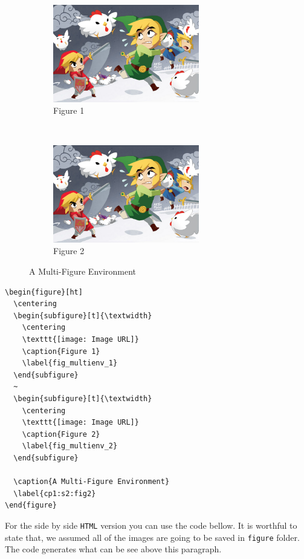 \documentclass[12pt]{report}
\begin{document}
\begin{figure}[ht]
	\centering
	\begin{subfigure}[t]{\textwidth}
		\centering
		\includegraphics[width=0.7\textwidth]{figures/Sample/tumblr_static_eaceks0rfxsss8o4swscw40wo.jpg}
		\caption{Figure 1}
		\label{fig_multienv_1}
	\end{subfigure}
	~
	\begin{subfigure}[t]{\textwidth}
		\centering
		\includegraphics[width=0.7\textwidth]{figures/Sample/tumblr_static_eaceks0rfxsss8o4swscw40wo.jpg}
		\caption{Figure 2}
		\label{fig_multienv_2}
	\end{subfigure}
	
	\caption{A Multi-Figure Environment}
	\label{cp1:s2:fig2}
\end{figure}
\begin{verbatim}
\begin{figure}[ht]
  \centering
  \begin{subfigure}[t]{\textwidth}
    \centering
    \texttt{[image: Image URL]}
    \caption{Figure 1}
    \label{fig_multienv_1}
  \end{subfigure}
  ~
  \begin{subfigure}[t]{\textwidth}
    \centering
    \texttt{[image: Image URL]}
    \caption{Figure 2}
    \label{fig_multienv_2}
  \end{subfigure}

  \caption{A Multi-Figure Environment}
  \label{cp1:s2:fig2}
\end{figure}
\end{verbatim}
For the side by side  \texttt{HTML} version you can use the code bellow. It is
worthful to state that, we assumed all of the images are going to be saved in
\texttt{figure} folder. The code generates what can be see above this paragraph.
\end{document}
